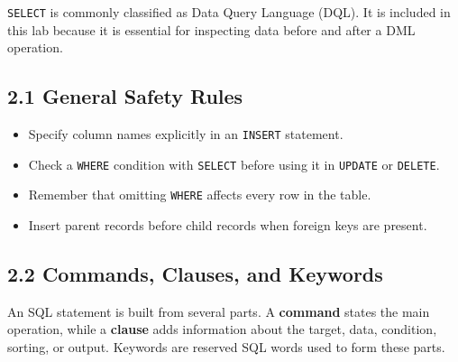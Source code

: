 \documentclass[12pt,a4paper]{article}
\begin{document}
\texttt{SELECT} is commonly classified as Data Query Language (DQL). It is included in this lab
because it is essential for inspecting data before and after a DML operation.

\subsection*{2.1 General Safety Rules}
\begin{itemize}
    \item Specify column names explicitly in an \texttt{INSERT} statement.
    \item Check a \texttt{WHERE} condition with \texttt{SELECT} before using it in \texttt{UPDATE} or \texttt{DELETE}.
    \item Remember that omitting \texttt{WHERE} affects every row in the table.
    \item Insert parent records before child records when foreign keys are present.
\end{itemize}

\subsection*{2.2 Commands, Clauses, and Keywords}
An SQL statement is built from several parts. A \textbf{command} states the main operation, while
a \textbf{clause} adds information about the target, data, condition, sorting, or output.
Keywords are reserved SQL words used to form these parts.
\end{document}
